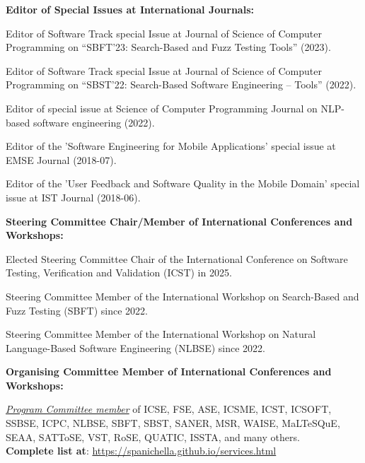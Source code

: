 \documentclass[11pt]{article}
\begin{document}
\medskip 

\textbf{Editor of Special Issues at International Journals:}
\begin{innerlist}
   \item Editor of Software Track special Issue at Journal of Science of Computer Programming on ``SBFT'23: Search-Based and Fuzz Testing Tools'' (2023).
   \item Editor of Software Track special Issue at Journal of Science of Computer Programming on ``SBST’22: Search-Based Software Engineering – Tools'' (2022).
   \item Editor of special issue at Science of Computer Programming Journal on NLP-based software engineering (2022).
   \item Editor of the 'Software Engineering for Mobile Applications' special issue at EMSE Journal (2018-07).
   \item Editor of the 'User Feedback and Software Quality in the Mobile Domain' special issue at IST Journal (2018-06).
\end{innerlist}

\medskip 

\textbf{Steering Committee Chair/Member of International Conferences and Workshops:}
\begin{innerlist}
   \item Elected Steering Committee Chair of the International Conference on Software Testing, Verification and Validation (ICST) in 2025.
   \item Steering Committee Member of the International Workshop on Search-Based and Fuzz Testing (SBFT) since 2022.
   \item Steering Committee Member of the International Workshop on Natural Language-Based Software Engineering (NLBSE) since 2022.
\end{innerlist}

\medskip 

\textbf{Organising Committee Member of International Conferences and Workshops:}
\begin{innerlist}
 \item \href{https://spanichella.github.io/services.html}{\textit{Program Committee member}} of ICSE, FSE, ASE, ICSME, ICST, ICSOFT, SSBSE, ICPC, NLBSE, SBFT, SBST, SANER, MSR, WAISE, MaLTeSQuE, SEAA, SATToSE, VST, RoSE, QUATIC, ISSTA, and many others. 
 \\\textbf{Complete list at}: \href{https://spanichella.github.io/services.html}{https://spanichella.github.io/services.html}
\end{innerlist}
\end{document}
